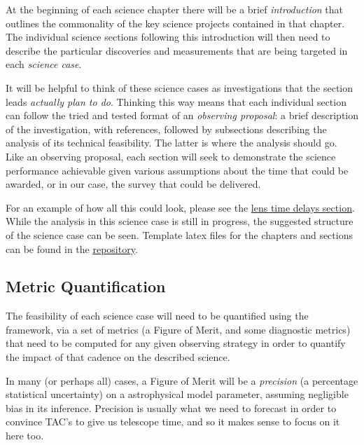 At the beginning of each science chapter there will be a brief
\textit{introduction} that outlines the commonality of the key science
projects contained in that chapter. The individual science sections
following this introduction will then need to describe the particular
discoveries and measurements that are being targeted in each
\textit{science case}.

It will be helpful to think of these science
cases as investigations that the section leads {\it actually plan to
do}. Thinking this way means that each individual section can follow the
tried and tested format of an {\it observing proposal}: a brief
description of the investigation, with references, followed by subsections
describing the analysis
of its technical feasibility. The latter is where the \MAF analysis
should go. Like an observing proposal, each section will seek to
demonstrate the science performance achievable given various assumptions
about the time that could be awarded, or in our case, the survey that
could be delivered.

For an example of how all this could look, please see the
\hyperref[sec:lenstimedelays]{lens time delays section}. While the \MAF
analysis in this science case is still in progress, the suggested
structure of the science case can be seen. Template latex files for the
chapters and sections can be found in the
\href{https://github.com/LSSTScienceCollaborations/ObservingStrategy}{\GitHub
repository}.


\subsection{Metric Quantification}
\label{sec:\secname:metrics}

The feasibility of each science case will need to be quantified using
the \MAF framework, via a set of metrics (a Figure of Merit, and some
diagnostic metrics)  that need to be computed for any given observing
strategy in order to quantify the impact of that cadence on the
described science.

In many (or perhaps all) cases, a Figure of Merit will be a
\textit{precision} (\ie a percentage statistical uncertainty) on a
astrophysical model parameter, assuming negligible bias in its
inference. Precision is usually what we need to forecast in order to
convince TAC's to give us telescope time, and so it makes sense to focus
on it here too.


